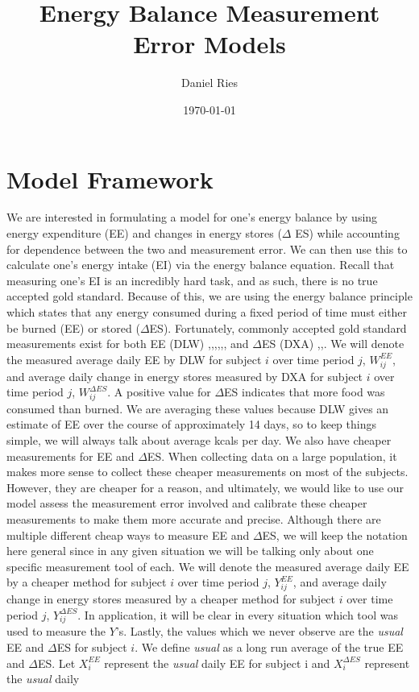 \documentclass[11pt]{article}\usepackage[]{graphicx}\usepackage[]{color}
\begin{document}
\title{Energy Balance Measurement Error Models}
\author{Daniel Ries}
\date{\today}
\maketitle

\section{Model Framework}

We are interested in formulating a model for one's energy balance by using energy expenditure (EE) and changes in energy stores ($\Delta$ ES) while accounting for dependence between the two and measurement error. We can then use this to calculate one's energy intake (EI) via the energy balance equation. Recall that measuring one's EI is an incredibly hard task, and as such, there is no true accepted gold standard. Because of this, we are using the energy balance principle which states that any energy consumed during a fixed period of time must either be burned (EE) or stored ($\Delta$ES). Fortunately, commonly accepted gold standard measurements exist for both EE (DLW) \cite{lagerros},\cite{bouten},\cite{thomas11},\cite{hall11},\cite{gilmore},\cite{sanghvi15}, \cite{racette11} and $\Delta$ES (DXA) \cite{thomas11},\cite{sanghvi15},\cite{gilmore}. We will denote the measured average daily EE by DLW for subject $i$ over time period $j$, $W_{ij}^{EE}$, and average daily change in energy stores measured by DXA for subject $i$ over time period $j$, $W_{ij}^{\Delta ES}$. A positive value for $\Delta$ES indicates that more food was consumed than burned. We are averaging these values because DLW gives an estimate of EE over the course of approximately 14 days, so to keep things simple, we will always talk about average kcals per day. We also have cheaper measurements for EE and $\Delta$ES. When collecting data on a large population, it makes more sense to collect these cheaper measurements on most of the subjects. However, they are cheaper for a reason, and ultimately, we would like to use our model assess the measurement error involved and calibrate these cheaper measurements to make them more accurate and precise. Although there are multiple different cheap ways to measure EE and $\Delta$ES, we will keep the notation here general since in any given situation we will be talking only about one specific measurement tool of each. We will denote the measured average daily EE by a cheaper method for subject $i$ over time period $j$, $Y_{ij}^{EE}$, and average daily change in energy stores measured by a cheaper method for subject $i$ over time period $j$, $Y_{ij}^{\Delta ES}$. In application, it will be clear in every situation which tool was used to measure the $Y$'s. Lastly, the values which we never observe are the \emph{usual} EE and $\Delta$ES for subject $i$. We define \emph{usual} as a long run average of the true EE and $\Delta$ES. Let $X_i^{EE}$ represent the \emph{usual} daily EE for subject i and $X_i^{\Delta ES}$ represent the \emph{usual} daily 
\end{document}
